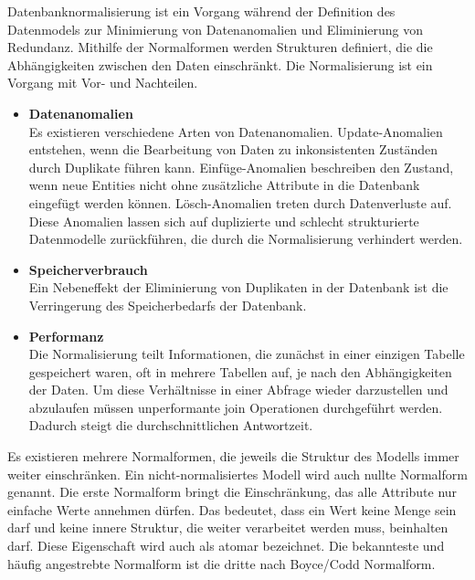 Datenbanknormalisierung ist ein Vorgang während der Definition des Datenmodels zur Minimierung von Datenanomalien und Eliminierung von Redundanz. Mithilfe der Normalformen werden Strukturen definiert, die die Abhängigkeiten zwischen den Daten einschränkt. Die Normalisierung ist ein Vorgang mit Vor- und Nachteilen.

\begin{itemize}
\item \textbf{Datenanomalien} \\
Es existieren verschiedene Arten von Datenanomalien. Update-Anomalien entstehen, wenn die Bearbeitung von Daten zu inkonsistenten Zuständen durch Duplikate führen kann. Einfüge-Anomalien beschreiben den Zustand, wenn neue Entities nicht ohne zusätzliche Attribute in die Datenbank eingefügt werden können. Lösch-Anomalien treten durch Datenverluste auf. Diese Anomalien lassen sich auf duplizierte und schlecht strukturierte Datenmodelle zurückführen, die durch die Normalisierung verhindert werden.
\item \textbf{Speicherverbrauch} \\
Ein Nebeneffekt der Eliminierung von Duplikaten in der Datenbank ist die Verringerung des Speicherbedarfs der Datenbank.
\item \textbf{Performanz} \\
Die Normalisierung teilt Informationen, die zunächst in einer einzigen Tabelle gespeichert waren, oft in mehrere Tabellen auf, je nach den Abhängigkeiten der Daten. Um diese Verhältnisse in einer Abfrage wieder darzustellen und abzulaufen müssen unperformante join Operationen durchgeführt werden. Dadurch steigt die durchschnittlichen Antwortzeit.
\end{itemize}

Es existieren mehrere Normalformen, die jeweils die Struktur des Modells immer weiter einschränken. Ein nicht-normalisiertes Modell wird auch nullte Normalform genannt.
Die erste Normalform bringt die Einschränkung, das alle Attribute nur einfache Werte annehmen dürfen. Das bedeutet, dass ein Wert keine Menge sein darf und keine innere Struktur, die weiter verarbeitet werden muss, beinhalten darf. Diese Eigenschaft wird auch als atomar bezeichnet.
Die bekannteste und häufig angestrebte Normalform ist die dritte nach Boyce/Codd Normalform. 

